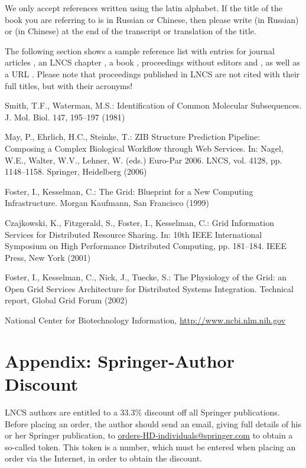 \documentclass[runningheads,a4paper]{llncs}
\begin{document}
We only accept references written using the latin alphabet. If the title
of the book you are referring to is in Russian or Chinese, then please write
(in Russian) or (in Chinese) at the end of the transcript or translation
of the title.

The following section shows a sample reference list with entries for
journal articles \cite{jour}, an LNCS chapter \cite{lncschap}, a book
\cite{book}, proceedings without editors \cite{proceeding1} and
\cite{proceeding2}, as well as a URL \cite{url}.
Please note that proceedings published in LNCS are not cited with their
full titles, but with their acronyms!

\begin{thebibliography}{4}

 Smith, T.F., Waterman, M.S.: Identification of Common Molecular
Subsequences. J. Mol. Biol. 147, 195--197 (1981)

 May, P., Ehrlich, H.C., Steinke, T.: ZIB Structure Prediction Pipeline:
Composing a Complex Biological Workflow through Web Services. In: Nagel,
W.E., Walter, W.V., Lehner, W. (eds.) Euro-Par 2006. LNCS, vol. 4128,
pp. 1148--1158. Springer, Heidelberg (2006)

 Foster, I., Kesselman, C.: The Grid: Blueprint for a New Computing
Infrastructure. Morgan Kaufmann, San Francisco (1999)

 Czajkowski, K., Fitzgerald, S., Foster, I., Kesselman, C.: Grid
Information Services for Distributed Resource Sharing. In: 10th IEEE
International Symposium on High Performance Distributed Computing, pp.
181--184. IEEE Press, New York (2001)

 Foster, I., Kesselman, C., Nick, J., Tuecke, S.: The Physiology of the
Grid: an Open Grid Services Architecture for Distributed Systems
Integration. Technical report, Global Grid Forum (2002)

 National Center for Biotechnology Information, \url{http://www.ncbi.nlm.nih.gov}

\end{thebibliography}


\section*{Appendix: Springer-Author Discount}

LNCS authors are entitled to a 33.3\% discount off all Springer
publications. Before placing an order, the author should send an email, 
giving full details of his or her Springer publication,
to \url{orders-HD-individuals@springer.com} to obtain a so-called token. This token is a
number, which must be entered when placing an order via the Internet, in
order to obtain the discount.
\end{document}
